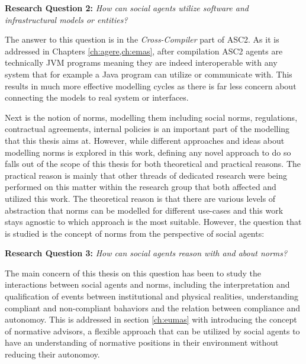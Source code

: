 \textbf{Research Question 2:} \textit{How can social agents utilize software and infrastructural models or entities?}

The answer to this question is in the \textit{Cross-Compiler} part of ASC2. As it is addressed in Chapters \ref{ch:agere,ch:emas}, after compilation ASC2 agents are technically JVM programs meaning they are indeed interoperable with any system that for example a Java program can utilize or communicate with. This results in much more effective modelling cycles as there is far less concern about connecting the models to real system or interfaces.


Next is the notion of norms, modelling them including social norms, regulations, contractual agreements, internal policies is an important part of the modelling that this thesis aims at. However, while different approaches and ideas about modelling norms is explored in this work, defining any novel approach to do so falls out of the scope of this thesis for both theoretical and practical reasons. The practical reason is mainly that other threads of dedicated research were being performed on this matter within the research group that both affected and utilized this work. The theoretical reason is that there are various levels of abstraction that norms can be modelled for different use-cases and this work stays agnostic to which approach is the most suitable. However, the question that is studied is the concept of norms from the perspective of social agents:


\textbf{Research Question 3:} \textit{How can social agents reason with and about norms?}


The main concern of this thesis on this question has been to study the interactions between social agents and norms, including the interpretation and qualification of events between institutional and physical realities, understanding compliant and non-compliant bahaviors and the relation between compliance and autonomoy. This is addressed in section \ref{ch:eumas} with introducing the concept of normative advisors, a flexible approach that can be utilized by social agents to have an understanding of normative positions in their environment without reducing their autonomoy.


